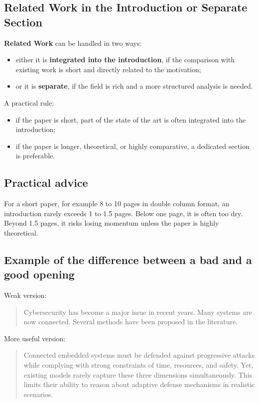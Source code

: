 \documentclass[11pt,a4paper]{article}
\theoremstyle{definition}
\begin{document}
\subsection*{Related Work in the Introduction or Separate Section}

\textbf{Related Work} can be handled in two ways:
\begin{itemize}
    \item either it is \textbf{integrated into the introduction}, if the comparison with existing work is short and directly related to the motivation;
    \item or it is \textbf{separate}, if the field is rich and a more structured analysis is needed.
\end{itemize}

A practical rule:
\begin{itemize}
    \item if the paper is short, part of the state of the art is often integrated into the introduction;
    \item if the paper is longer, theoretical, or highly comparative, a dedicated section is preferable.
\end{itemize}

\subsection*{Practical advice}

For a short paper, for example 8 to 10 pages in double column format, an introduction rarely exceeds 1 to 1.5 pages. Below one page, it is often too dry. Beyond 1.5 pages, it risks losing momentum unless the paper is highly theoretical.

\subsection*{Example of the difference between a bad and a good opening}

Weak version:
\begin{quote}
Cybersecurity has become a major issue in recent years. Many systems are now connected. Several methods have been proposed in the literature.
\end{quote}

More useful version:
\begin{quote}
Connected embedded systems must be defended against progressive attacks while complying with strong constraints of time, resources, and safety. Yet, existing models rarely capture these three dimensions simultaneously. This limits their ability to reason about adaptive defense mechanisms in realistic scenarios.
\end{quote}
\end{document}
